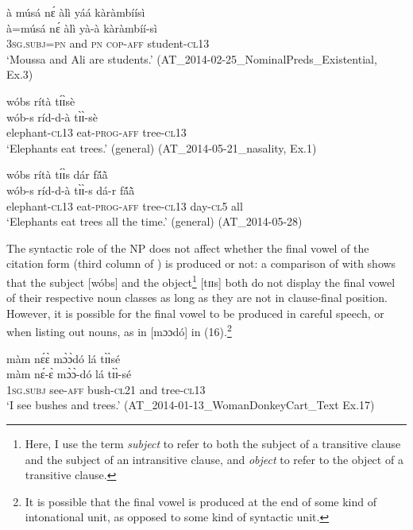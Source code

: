 \documentclass[output=paper]{langsci/langscibook}
\begin{document}
\ea\label{ex:teo:13}
\glll à músá n\'ɛ àlì yáá kàràmbíísì\\
à=músá n\'ɛ àlì yà-à kàràmbíí-sì\\
\textsc{3sg.subj=pn} and \textsc{pn} \textsc{cop-aff} student-\textsc{cl13}\\
\glt ‘Moussa and Ali are students.’ (AT\_2014-02-25\_NominalPreds\_Existential, Ex.3)
\z

\ea\label{ex:teo:14}
\glll wóbs rítà t\'ɪ\`ɪsè\\
 wób-s ríd-d-à t\`ɪ\`ɪ-sè\\
elephant-\textsc{cl13} eat-\textsc{prog-aff} tree-\textsc{cl13}\\
\glt ‘Elephants eat trees.’ (general) (AT\_2014-05-21\_nasality, Ex.1)
\z

\ea\label{ex:teo:15}
\glll wóbs rítà t\'ɪ\`ɪs dár f\'{ã}\`{ã}\\
 wób-s ríd-d-à t\`ɪ\`ɪ-s dá-r f\'{ã}\`{ã}\\
elephant-\textsc{cl13} eat-\textsc{prog-aff} tree-\textsc{cl13} day-\textsc{cl5} all\\
\glt ‘Elephants eat trees all the time.’ (general) (AT\_2014-05-28)
\z

The syntactic role of the NP does not affect whether the final vowel of the citation form (third column of ) is produced or not: a comparison of  with  shows that the subject [wóbs] and the object\footnote{Here, I use the term \textit{subject} to refer to both the subject of a transitive clause and the subject of an intransitive clause, and \textit{object} to refer to the object of a transitive clause.} [tɪɪs] both do not display the final vowel of their respective noun classes as long as they are not in clause-final position. However, it is possible for the final vowel to be produced in careful speech, or when listing out nouns, as in [mɔɔdó] in (16).\footnote{It is possible that the final vowel is produced at the end of some kind of intonational unit, as opposed to some kind of syntactic unit.}

\ea\label{ex:teo:16}
\glll màm n\'ɛ\`ɛ m\`ɔ\`ɔdó lá t\`ɪ\`ɪsé\\
 màm n\'ɛ-\`ɛ m\`ɔ\`ɔ-dó lá t\`ɪ\`ɪ-sé\\
1\textsc{sg.subj} see-\textsc{aff} bush-\textsc{cl21} and tree-\textsc{cl13}\\
\glt ‘I see bushes and trees.’ (AT\_2014-01-13\_WomanDonkeyCart\_Text Ex.17)
\z
\end{document}
